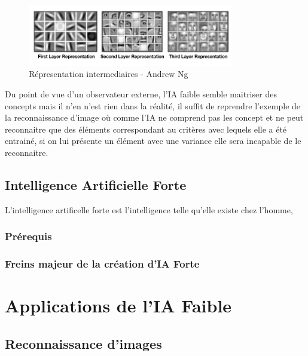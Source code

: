 \begin{figure}[!h]
    \centering
    \includegraphics[width=0.8\textwidth]{Images/layeredrepresentation}
    \caption{Répresentation intermediaires - Andrew Ng}
	\label{fig:deepneuralnetwork}
\end{figure}

Du point de vue d'un observateur externe, l'IA faible
semble maitriser des concepts mais il n'en n'est rien dans la 
réalité, il suffit de reprendre l'exemple de la reconnaissance d'image
où comme l'IA ne comprend pas les concept et ne peut reconnaitre 
que des éléments correspondant au critères avec lequels elle a été 
entrainé, si on lui présente un élément avec une variance elle 
sera incapable de le reconnaitre.

\section{Intelligence Artificielle Forte}
L'intelligence artificelle forte est l'intelligence
telle qu'elle existe chez l'homme, 

\subsection{Prérequis}
\subsection{Freins majeur de la création d'IA Forte}
\chapter{Applications de l'IA Faible}
\section{Reconnaissance d'images}